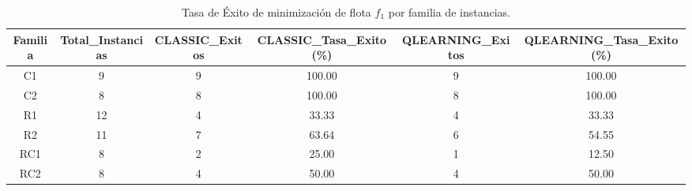 \begin{table}
\caption{Tasa de Éxito de minimización de flota $f_1$ por familia de instancias.}
\label{tab:exito_f1_familias}
\begin{tabular}{cccccc}
\toprule
Familia & Total\_Instancias & CLASSIC\_Exitos & CLASSIC\_Tasa\_Exito (\%) & QLEARNING\_Exitos & QLEARNING\_Tasa\_Exito (\%) \\
\midrule
C1 & 9 & 9 & 100.00 & 9 & 100.00 \\
C2 & 8 & 8 & 100.00 & 8 & 100.00 \\
R1 & 12 & 4 & 33.33 & 4 & 33.33 \\
R2 & 11 & 7 & 63.64 & 6 & 54.55 \\
RC1 & 8 & 2 & 25.00 & 1 & 12.50 \\
RC2 & 8 & 4 & 50.00 & 4 & 50.00 \\
\bottomrule
\end{tabular}
\end{table}
